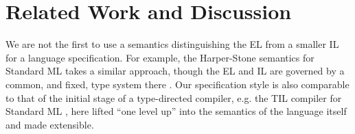 \documentclass[pldi]{sigplanconf-pldi15}
\begin{document}

\section{Related Work and Discussion}\label{prior-work}
\noindent We are not the first to use a semantics distinguishing the EL from a smaller IL  for a language specification. For example, the Harper-Stone semantics for Standard ML takes a similar approach, though the EL and IL are governed by a common, and fixed, type system there \cite{Harper00atype-theoretic}. Our specification style is also comparable to that of the initial stage of a type-directed compiler, e.g. the TIL compiler for Standard ML \cite{tarditi+:til-OLD}, here lifted ``one level up'' into the semantics of the language itself and made extensible. %
\end{document}
